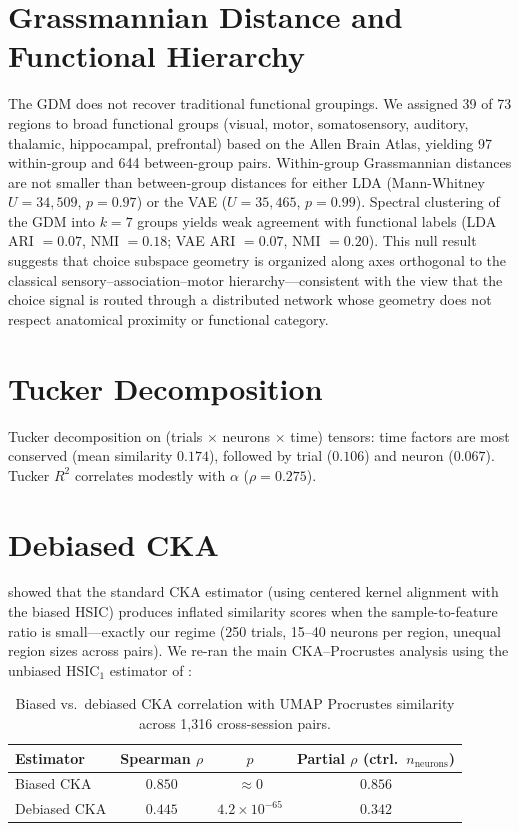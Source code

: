 \documentclass{article}
\begin{document}
\section{Grassmannian Distance and Functional Hierarchy}
\label{app:gdm_hierarchy}

The GDM does not recover traditional functional groupings. We assigned 39 of 73 regions to broad functional groups (visual, motor, somatosensory, auditory, thalamic, hippocampal, prefrontal) based on the Allen Brain Atlas, yielding 97 within-group and 644 between-group pairs. Within-group Grassmannian distances are not smaller than between-group distances for either LDA (Mann-Whitney $U = 34{,}509$, $p = 0.97$) or the VAE ($U = 35{,}465$, $p = 0.99$). Spectral clustering of the GDM into $k = 7$ groups yields weak agreement with functional labels (LDA ARI $= 0.07$, NMI $= 0.18$; VAE ARI $= 0.07$, NMI $= 0.20$). This null result suggests that choice subspace geometry is organized along axes orthogonal to the classical sensory--association--motor hierarchy---consistent with the view that the choice signal is routed through a distributed network whose geometry does not respect anatomical proximity or functional category.

\section{Tucker Decomposition}
\label{app:tucker}

Tucker decomposition on (trials $\times$ neurons $\times$ time) tensors: time factors are most conserved (mean similarity $0.174$), followed by trial ($0.106$) and neuron ($0.067$). Tucker $R^2$ correlates modestly with $\alpha$ ($\rho = 0.275$).

\section{Debiased CKA}
\label{app:debiased_cka}

\citet{murphy2024biased} showed that the standard CKA estimator (using centered kernel alignment with the biased HSIC) produces inflated similarity scores when the sample-to-feature ratio is small---exactly our regime (250 trials, 15--40 neurons per region, unequal region sizes across pairs). We re-ran the main CKA--Procrustes analysis using the unbiased HSIC$_1$ estimator of \citet{song2012feature}:

\begin{table}[h]
\centering
\small
\caption{Biased vs.\ debiased CKA correlation with UMAP Procrustes similarity across 1,316 cross-session pairs.}
\label{tab:debiased_cka}
\begin{tabular}{@{}lccc@{}}
\toprule
\textbf{Estimator} & \textbf{Spearman $\rho$} & \textbf{$p$} & \textbf{Partial $\rho$ (ctrl.\ $n_{\text{neurons}}$)} \\
\midrule
Biased CKA & $0.850$ & $\approx 0$ & $0.856$ \\
Debiased CKA & $0.445$ & $4.2 \times 10^{-65}$ & $0.342$ \\
\bottomrule
\end{tabular}
\end{table}
\end{document}
